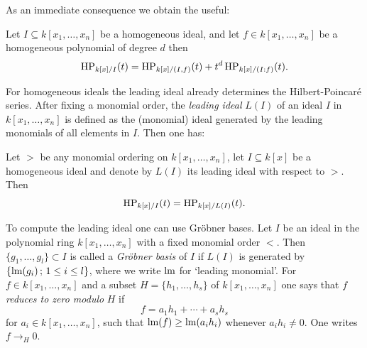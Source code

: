 As an immediate consequence we obtain the useful:

\begin{samepage}
\begin{Cor}\label{cor:hilbert_hilbert_trick_2}
  Let $I\subseteq k[x_1,\ldots, x_n]$ be a homogeneous ideal, and let
  $f\in k[x_1,\ldots, x_n]$ be a homogeneous polynomial of degree $d$
  then $$\operatorname{HP}_{k[x]/I}(t) = \operatorname{HP}_{k[x]/(I,f)}(t) + t^d\operatorname{HP}_{k[x]/(I:f)}(t).$$
\end{Cor}
\end{samepage}

For homogeneous ideals the leading ideal already determines the
Hilbert-Poincar\'{e} series. After fixing a monomial order, the \textit{leading ideal} $L(I)$ of an ideal $I$ in $k[x_1,\ldots,x_n]$ is defined as the (monomial) ideal generated by the leading monomials of all elements in $I$. Then one has:

\begin{samepage}
\begin{Thm}\label{thm:hilbert_leading} Let $>$ be any
  monomial ordering on $k[x_1,\ldots, x_n]$, let $I\subseteq k[x]$
  be a homogeneous ideal and denote by $L(I)$ its leading ideal with
  respect to $>$. Then $$\operatorname{HP}_{k[x]/I}(t) = \operatorname{HP}_{k[x]/L(I)}(t).$$
\end{Thm}
\end{samepage}

To compute the leading ideal one can use Gr\"obner bases. Let $I$ be an ideal in the polynomial ring $k[x_1,\ldots, x_n]$ with a fixed monomial order $<$. Then $\{g_1,\ldots, g_l\}\subset I$ is called a \textit{Gr\"obner basis} of $I$ if $L(I)$ is generated by $\{ \textnormal{lm}(g_i) \,;\, 1\leq i\leq l\}$, where we write $\textnormal{lm}$ for `leading monomial'. For $f\in k[x_1,\ldots, x_n]$ and a subset $H = \{h_1,\ldots, h_s\}$ of $k[x_1,\ldots ,x_n]$ one says that $f$ \textit{reduces to zero modulo} $H$ if 
\[  f = a_1h_1 + \cdots + a_sh_s \]
for $a_i \in k[x_1,\ldots, x_n]$, such that $\textnormal{lm}(f) \geq \textnormal{lm}(a_ih_i) $ whenever $a_ih_i\neq 0$. One writes $f \rightarrow_H 0$.

